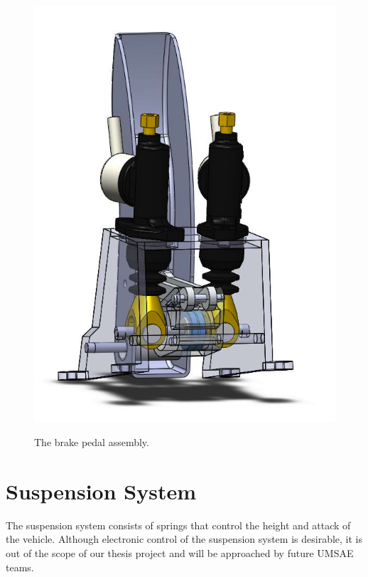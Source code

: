 \begin{figure}[h!]
{			\label{fig:brake_pedal_assy_b}\includegraphics[scale=0.4]{figures/brake_pedal_assy_b.png}}
    \caption{The brake pedal assembly.}
    \label{fig:brake_pedal_assy}
\end{figure}

\section{Suspension System}

The suspension system consists of springs that control the height and attack of the vehicle. Although electronic control of the suspension system is desirable, it is out of the scope of our thesis project and will be approached by future UMSAE teams.
